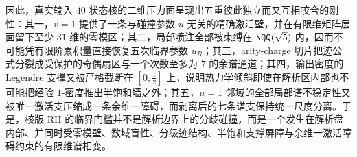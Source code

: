 \noindent
因此，真实输入 \(40\) 状态核的二维压力面呈现出五重彼此独立而又互相咬合的刚性：其一，\(v=1\) 提供了一条与碰撞参数 \(u\) 无关的精确激活壁，并在有限维矩阵层面留下至少 \(31\) 维的零模区；其二，局部喷注全部被束缚在 \(\QQ(\sqrt5)\) 内，因而不可能凭有限阶累积量直接恢复五次临界参数 \(u_R\)；其三，arity-charge 切片把迹公式分裂成受保护的奇偶扇区与一个次数至多为 \(7\) 的余谱通道；其四，输出密度的 Legendre 支撑又被严格截断在 \([0,\tfrac12]\) 上，说明热力学倾斜即使在解析区内部也不可能把经验 \(1\)-密度推出半饱和墙之外；其五，\(u=1\) 邻域的全部局部谱不稳定性又被唯一激活支压缩成一条余维一障碍，而剥离后的七条谱支保持统一尺度分离。于是，核版 RH 的临界门槛并不是解析边界上的分歧碰撞，而是一个发生在解析盘内部、并同时受零模壁、数域盲性、分级迹结构、半饱和支撑屏障与余维一激活障碍约束的有限维谱相变。

\endinput
